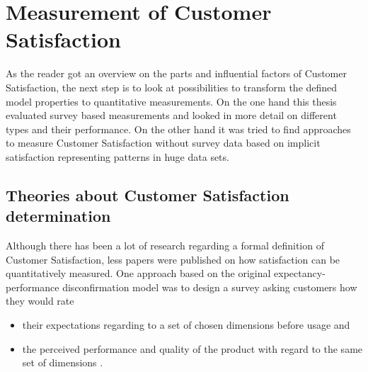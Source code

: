 \section{Measurement of Customer Satisfaction}
As the reader got an overview on the parts and influential factors of Customer Satisfaction, the next step is to look at possibilities to transform the defined model properties to quantitative measurements. On the one hand this thesis evaluated survey based measurements and looked in more detail on different types and their performance. On the other hand it was tried to find approaches to measure Customer Satisfaction without survey data based on implicit satisfaction representing patterns in huge data sets. 

\subsection{Theories about Customer Satisfaction determination}
\label{ssec:custSatTheories}
Although there has been a lot of research regarding a formal definition of Customer Satisfaction, less papers were published on how satisfaction can be quantitatively measured. One approach based on the original expectancy-performance disconfirmation model was to design a survey asking customers how they would rate

\begin{itemize}
	\item their expectations regarding to a set of chosen dimensions before usage and
	\item the perceived performance and quality of the product with regard to the same set of dimensions \cite{prakash1983reliability}.
\end{itemize}

